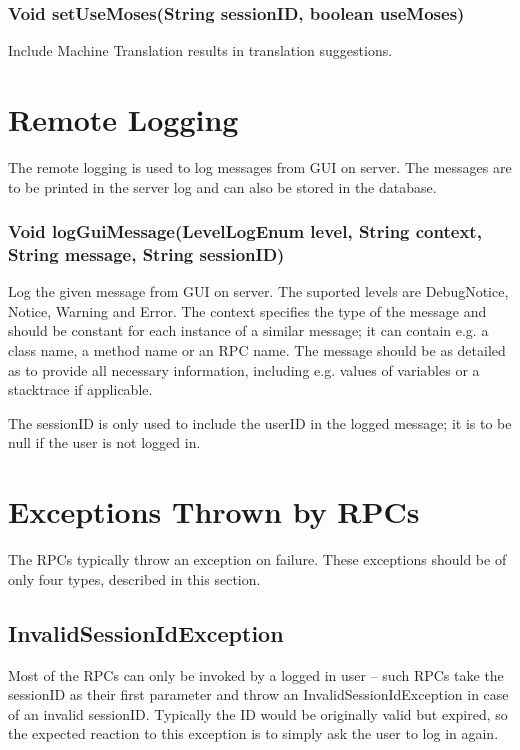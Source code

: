 \subsubsection{Void setUseMoses(String sessionID, boolean useMoses)}
Include Machine Translation results in translation suggestions.

\section{Remote Logging}

The remote logging is used to log messages from GUI on server. The messages are to be printed in the server log and can also be stored in the database.

\subsubsection{Void logGuiMessage(LevelLogEnum level, String context, String message, String sessionID)}
Log the given message from GUI on server.
The suported levels are DebugNotice, Notice, Warning and Error.
The context specifies the type of the message and should be constant for each instance of a similar message; it can contain e.g. a class name, a method name or an RPC name. The message should be as detailed as to provide all necessary information, including e.g. values of variables or a stacktrace if applicable.

The sessionID is only used to include the userID in the logged message; it is to be null if the user is not logged in.

\section{Exceptions Thrown by RPCs}

The RPCs typically throw an exception on failure. These exceptions should be of only four types, described in this section.

\subsection{InvalidSessionIdException}

Most of the RPCs can only be invoked by a logged in user -- such RPCs take the sessionID as their first parameter and throw an InvalidSessionIdException in case of an invalid sessionID. Typically the ID would be originally valid but expired, so the expected reaction to this exception is to simply ask the user to log in again.

